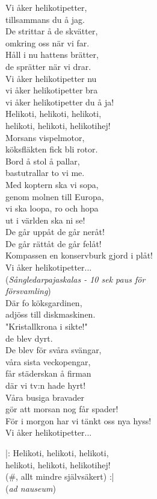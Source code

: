 \documentclass[12pt]{article}
\begin{document}
\noindent
\begin{minipage}{.5\textwidth}
	\noindent
	Vi åker helikotipetter,\\
	tillsammans du å jag.\\
	De strittar å de skvätter,\\
	omkring oss när vi far.\\
	Håll i nu hattens brätter,\\
	de sprätter när vi drar.\\
	Vi åker helikotipetter nu\\
	vi åker helikotipetter bra\\
	vi åker helikotipetter du å ja!\\
	Helikoti, helikoti, helikoti, \\
	helikoti, helikoti, helikotihej!\\

	\noindent
	Morsans vispelmotor,\\
	köksfläkten fick bli rotor.\\
	Bord å stol å pallar,\\
	bastutrallar to vi me.\\
	Med koptern ska vi sopa,\\
	genom molnen till Europa,\\
	vi ska loopa, ro och hopa\\
	ut i världen ska ni se!\\
	De går uppåt de går neråt!\\
	De går rättåt de går felåt!\\
	Kompassen en konservburk gjord i plåt! \\

	Vi åker helikotipetter...\\
	
	(\textit{Sångledarpajaskalas - 10 sek paus för\\ försvamling})\\
	
	\noindent
	Där fo köksgardinen,\\
	adjöss till diskmaskinen.\\
	"Kristallkrona i sikte!"\\
	de blev dyrt.\\
	De blev för svåra svängar,\\
	våra sista veckopengar,\\
	får städerskan å firman\\
	där vi tv:n hade hyrt!\\
	Våra busiga bravader\\
	gör att morsan nog får spader!\\
	För i morgon har vi tänkt oss nya hyss! \\

	Vi åker helikotipetter...\\

	\noindent

	|: Helikoti, helikoti, helikoti, \\
	helikoti, helikoti, helikotihej!\\
	(\#, allt mindre självsäkert) :|\\
	(\textit{ad nauseum})
	\vspace{0.2cm}
	
\end{minipage}%
\end{document}
